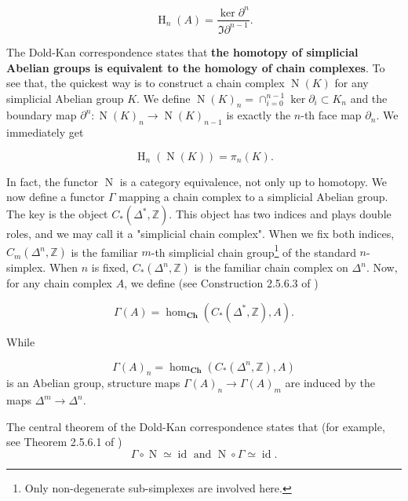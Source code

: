 \documentclass[reprint, amsmath, amssymb, showpacs, floatfix, longbibliography, aps, twocolumn, superscriptaddress, nofootinbib]{revtex4-2}
\newcommand{\ZZ}{{\mathbb Z}}
\theoremstyle{definition}
\begin{document}
\begin{equation}
	\operatorname{H}_n(A)=\frac{\ker \partial^n}{\Im \partial^{n-1}}.
\end{equation}

The Dold-Kan correspondence states that \textbf{the homotopy of simplicial Abelian groups is equivalent to the homology of chain complexes}. To see that, the quickest way is to construct a chain complex $\operatorname{N}(K)$ for any simplicial Abelian group $K$. We define $\operatorname{N}(K)_n=\cap_{i=0}^{n-1}\ker \partial_{i}\subset K_n$ and the boundary map $\partial^n:\operatorname{N}(K)_n\rightarrow\operatorname{N}(K)_{n-1}$ is exactly the $n$-th face map $\partial_n$. We immediately get

\begin{equation}\label{eqHomologyHomotopy1}
	\operatorname{H}_n(\operatorname{N}(K))= \pi_n(K).
\end{equation}

In fact, the functor $\operatorname{N}$ is a category equivalence, not only up to homotopy. We now define a functor $\Gamma$ mapping a chain complex to a simplicial Abelian group. The key is the object $C_*(\Delta^*,\ZZ)$. This object has two indices and plays double roles, and we may call it a "simplicial chain complex". When we fix both indices, $C_m(\Delta^n,\ZZ)$ is the familiar $m$-th simplicial chain group\footnote{Only non-degenerate sub-simplexes are involved here.} of the standard $n$-simplex. When $n$ is fixed, $C_*(\Delta^n,\ZZ)$ is the familiar chain complex on $\Delta^n$. Now, for any chain complex $A$, we define (see Construction 2.5.6.3 of \cite{kerodon})

\begin{equation}
	\Gamma(A)=\hom_{\mathbf{Ch}}(C_*(\Delta^*,\ZZ),A).
\end{equation}

While 

\begin{equation}
	\Gamma(A)_n=\hom_{\mathbf{Ch}}(C_*(\Delta^n,\ZZ),A)
\end{equation}
is an Abelian group, structure maps $\Gamma(A)_n\rightarrow \Gamma(A)_m$ are induced by the maps $\Delta^m\rightarrow \Delta^n$.

The central theorem of the Dold-Kan correspondence states that (for example, see Theorem 2.5.6.1 of \cite{kerodon})
\begin{equation}
	\Gamma\circ \operatorname{N}\simeq \operatorname{id} \text{ and } \operatorname{N}\circ \Gamma\simeq \operatorname{id}.
\end{equation}
\end{document}
